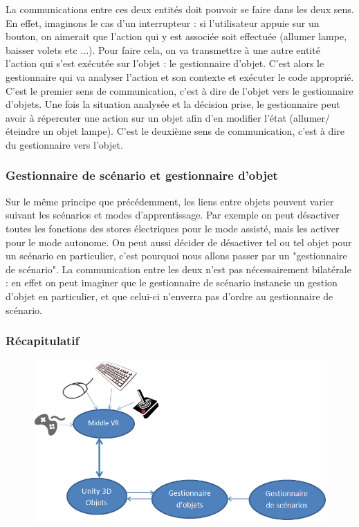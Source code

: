 La communications entre ces deux entités doit pouvoir se faire dans les deux sens. 
En effet, imaginons le cas d'un interrupteur : si l'utilisateur appuie sur un bouton, on aimerait que l'action qui y est associée soit effectuée (allumer lampe, baisser volets etc ...). 
Pour faire cela, on va transmettre à une autre entité l'action qui s'est exécutée sur l'objet : le gestionnaire d'objet. 
C'est alors le gestionnaire qui va analyser l'action et son contexte et exécuter le code approprié. C'est le premier sens de communication, c'est à dire de l'objet vers le gestionnaire d'objets.
Une fois la situation analysée et la décision prise, le gestionnaire peut avoir à répercuter une action sur un objet afin d'en modifier l'état (allumer/éteindre un objet lampe). 
C'est le deuxième sens de communication, c'est à dire du gestionnaire vers l'objet.

\subsubsection{Gestionnaire de scénario et gestionnaire d'objet}

Sur le même principe que précédemment, les liens entre objets peuvent varier suivant les scénarios et modes d'apprentissage. 
Par exemple on peut désactiver toutes les fonctions des stores électriques pour le mode assisté, mais les activer pour le mode autonome. 
On peut aussi décider de désactiver tel ou tel objet pour un scénario en particulier, c'est pourquoi nous allons passer par un "gestionnaire de scénario". 
La communication entre les deux n'est pas nécessairement bilatérale : en effet on peut imaginer que le gestionnaire de scénario instancie un gestion d'objet en particulier, et que celui-ci n'enverra pas d'ordre au gestionnaire de scénario.

\subsubsection{Récapitulatif}
\begin{figure}
	\centering
		\includegraphics[width=\textwidth]{2-Specifications/img/recap.png}
	\label{fig:unityvr}
\end{figure}


